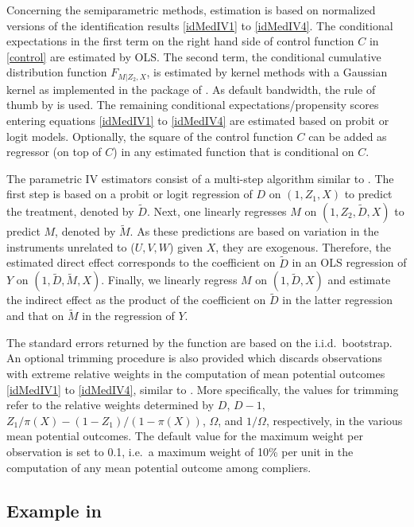 \documentclass[nojss]{jss}
\begin{document}
Concerning the semiparametric methods, estimation is based on normalized versions of the identification results \eqref{idMedIV1} to \eqref{idMedIV4}. The conditional expectations in the first term on the right hand side of control function $C$ in \eqref{control} are estimated by OLS. The second term, the conditional cumulative distribution function $F_{M|Z_{2},X}$, is estimated by kernel methods with a Gaussian kernel as implemented in the   package of \citet{HaRa08}. As default bandwidth, the rule of thumb by \citet{Silverman86} is used. The remaining conditional expectations/propensity scores entering equations \eqref{idMedIV1} to \eqref{idMedIV4} are estimated based on probit or logit models. Optionally, the square of the control function $C$ can be added as regressor (on top of $C$) in any estimated function that is conditional on $C$.

The parametric IV estimators consist of a multi-step algorithm similar to \citet{PoLeWo13}. The first step is based on a probit or logit regression of $D$ on $(1,Z_{1},X)$ to predict the treatment, denoted by $\tilde{D}$. Next, one linearly regresses $M$ on $(1,Z_{2},\tilde{D},X)$ to predict $M$, denoted by $\tilde{M}$. As these predictions are based on variation in the instruments unrelated to ($U,V,W$) given $X$, they are exogenous. Therefore, the estimated direct effect corresponds to the coefficient on $\tilde{D}$ in an OLS regression of $Y$ on $(1,\tilde{D},\tilde{M},X)$. Finally, we linearly regress $M$ on $(1,\tilde{D},X)$ and estimate the indirect effect as the product of the coefficient on $\tilde{D}$ in the latter regression and that on $\tilde{M}$ in the regression of $Y$.

The standard errors returned by the function  are based on the i.i.d.\ bootstrap. An optional trimming procedure is also provided which discards observations with extreme relative weights in the computation of mean potential outcomes \eqref{idMedIV1} to \eqref{idMedIV4}, similar to \citet{HuLeWu13}. More specifically, the values for trimming refer to the relative weights determined by $D$, $D-1$, $Z_1/\pi(X)-(1-Z_1)/(1-\pi(X))$, $\Omega$, and $1/\Omega$, respectively, in the various mean potential outcomes. The default value for the maximum weight per observation is set to 0.1, i.e.\ a maximum weight of 10\% per unit in the computation of any mean potential outcome among compliers.

\subsection[{Example in R}]{Example in }
\end{document}
